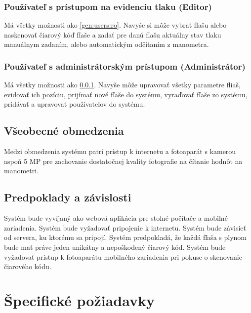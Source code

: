 \documentclass{zah}
\begin{document}
\subsubsection{Používateľ s prístupom na evidenciu tlaku (Editor)}
\label{gen:users:meter}

Má všetky možnosti ako \ref{gen:users:ro}. Navyše si môže vybrať fľašu alebo naskenovať čiarový kóď fľaše a zadať pre danú fľašu aktuálny stav tlaku manuálnym zadaním, alebo automatickým odčítaním z manometra.

\subsubsection{Používateľ s administrátorským prístupom (Administrátor)}
\label{gen:users:admin}

Má všetky možnosti ako \ref{gen:users:meter}. Navyše môže upravovať všetky parametre fliaš, evidovať ich pozíciu, prijímať nové fľaše do systému, vyraďovať fľaše zo systému, pridávať a upravovať používateľov do systému.

\subsection{Všeobecné obmedzenia}
\label{gen:constraints}

Medzi obmedzenia systému patrí prístup k internetu a fotoaparát s kamerou aspoň 5 MP pre zachovanie dostatočnej kvality fotografie na čítanie hodnôt na manometri. 

\subsection{Predpoklady a závislosti}
\label{gen:deps}

Systém bude vyvíjaný ako webová aplikácia pre stolné počítače a mobilné zariadenia. Systém bude vyžadovať pripojenie k internetu. Systém bude závisieť od servera, ku ktorému sa pripojí. Systém predpokladá, že každá fľaša s plynom bude mať práve jeden unikátny a nepoškodený čiarový kód. Systém bude vyžadovať prístup k fotoaparátu mobilného zariadenia pri pokuse o skenovanie čiarového kódu.

\cleardoublepage
\section{Špecifické požiadavky}
\label{reqs}
\end{document}
